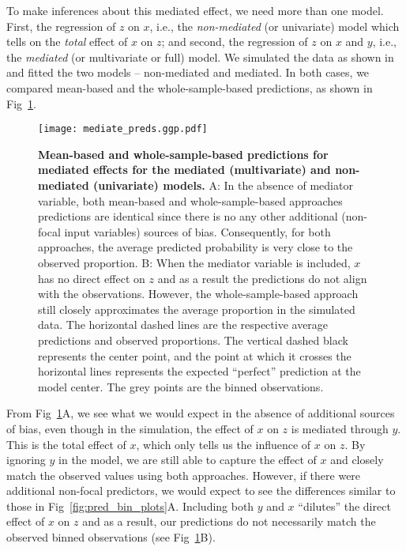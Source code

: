 To make inferences about this mediated effect, we need more than one model. First, the regression of $z$ on $x$, i.e., the \emph{non-mediated} (or univariate) model which tells on the \emph{total} effect of $x$ on $z$; and second, the regression of $z$ on $x$ and $y$, i.e., the \emph{mediated} (or multivariate or full) model. We simulated the data as shown in  and fitted the two models -- non-mediated and mediated. In both cases, we compared mean-based and the whole-sample-based predictions, as shown in Fig~\ref{fig:pred_mediated_plots}.

\begin{figure}
\begin{center}
\texttt{[image: mediate\_preds.ggp.pdf]}
\end{center}
\caption{{\bf Mean-based and whole-sample-based predictions for mediated effects for the mediated (multivariate) and non-mediated (univariate) models.} A: In the absence of mediator variable, both mean-based and whole-sample-based approaches predictions are identical since there is no any other additional (non-focal input variables) sources of bias. Consequently, for both approaches, the average predicted probability is very close to the observed proportion. B: When the mediator variable is included,  $x$ has no direct effect on $z$ and as a result the predictions do not align with the observations. However, the whole-sample-based approach still closely approximates the average proportion in the simulated data. The horizontal dashed lines are the respective average predictions and observed proportions. The vertical dashed black represents the center point, and the point at which it crosses the horizontal lines represents the expected ``perfect'' prediction at the model center. The grey points are the binned observations.}
\label{fig:pred_mediated_plots}
\end{figure}

From Fig~\ref{fig:pred_mediated_plots}A, we see what we would expect in the absence of additional sources of bias, even though in the simulation, the effect of $x$ on $z$ is mediated through $y$. This is the total effect of $x$, which only tells us the influence of $x$ on $z$. By ignoring $y$ in the model, we are still able to capture the effect of $x$ and closely match the observed values using both approaches. However, if there were additional non-focal predictors, we would expect to see the differences similar to those in Fig~\ref{fig:pred_bin_plots}A. Including both $y$ and $x$ ``dilutes'' the direct effect of $x$ on $z$ and as a result, our predictions do not necessarily match the observed binned observations (see Fig~\ref{fig:pred_mediated_plots}B).

